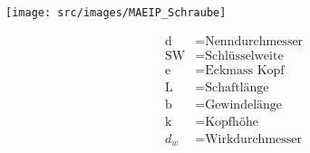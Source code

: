 \begin{scriptsize}
    \begin{minipage}{0.6\linewidth}
        \begin{center}
            \texttt{[image: src/images/MAEIP\_Schraube]}
        \end{center}
    \end{minipage}
    \begin{minipage}{0.38\linewidth}
        \begin{center}
            \begin{align*}
            \text{d} &= \text{Nenndurchmesser}
            \\\text{SW} &= \text{Schlüsselweite}
            \\\text{e} &= \text{Eckmass Kopf}
            \\\text{L} &= \text{Schaftlänge}
            \\\text{b} &= \text{Gewindelänge}
            \\\text{k} &= \text{Kopfhöhe}
            \\d_w &= \text{Wirkdurchmesser}
            \end{align*}
        \end{center}
    \end{minipage}
\end{scriptsize}